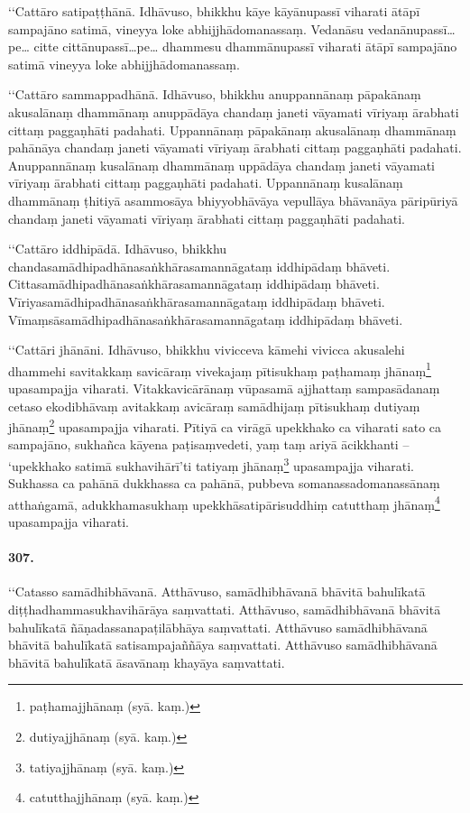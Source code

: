 ‘‘Cattāro satipaṭṭhānā. Idhāvuso, bhikkhu kāye kāyānupassī viharati ātāpī sampajāno satimā, vineyya loke abhijjhādomanassaṃ. Vedanāsu vedanānupassī…pe… citte cittānupassī…pe… dhammesu dhammānupassī viharati ātāpī sampajāno satimā vineyya loke abhijjhādomanassaṃ.

‘‘Cattāro sammappadhānā. Idhāvuso, bhikkhu anuppannānaṃ pāpakānaṃ akusalānaṃ dhammānaṃ anuppādāya chandaṃ janeti vāyamati vīriyaṃ ārabhati cittaṃ paggaṇhāti padahati. Uppannānaṃ pāpakānaṃ akusalānaṃ dhammānaṃ pahānāya chandaṃ janeti vāyamati vīriyaṃ ārabhati cittaṃ paggaṇhāti padahati. Anuppannānaṃ kusalānaṃ dhammānaṃ uppādāya chandaṃ janeti vāyamati vīriyaṃ ārabhati cittaṃ paggaṇhāti padahati. Uppannānaṃ kusalānaṃ dhammānaṃ ṭhitiyā asammosāya bhiyyobhāvāya vepullāya bhāvanāya pāripūriyā chandaṃ janeti vāyamati vīriyaṃ ārabhati cittaṃ paggaṇhāti padahati.

‘‘Cattāro iddhipādā. Idhāvuso, bhikkhu chandasamādhipadhānasaṅkhārasamannāgataṃ iddhipādaṃ bhāveti. Cittasamādhipadhānasaṅkhārasamannāgataṃ iddhipādaṃ bhāveti. Vīriyasamādhipadhānasaṅkhārasamannāgataṃ iddhipādaṃ bhāveti. Vīmaṃsāsamādhipadhānasaṅkhārasamannāgataṃ iddhipādaṃ bhāveti.

‘‘Cattāri jhānāni. Idhāvuso, bhikkhu vivicceva kāmehi vivicca akusalehi dhammehi savitakkaṃ savicāraṃ vivekajaṃ pītisukhaṃ paṭhamaṃ jhānaṃ\footnote{paṭhamajjhānaṃ (syā. kaṃ.)} upasampajja viharati. Vitakkavicārānaṃ vūpasamā ajjhattaṃ sampasādanaṃ cetaso ekodibhāvaṃ avitakkaṃ avicāraṃ samādhijaṃ pītisukhaṃ dutiyaṃ jhānaṃ\footnote{dutiyajjhānaṃ (syā. kaṃ.)} upasampajja viharati. Pītiyā ca virāgā upekkhako ca viharati sato ca sampajāno, sukhañca kāyena paṭisaṃvedeti, yaṃ taṃ ariyā ācikkhanti – ‘upekkhako satimā sukhavihārī’ti tatiyaṃ jhānaṃ\footnote{tatiyajjhānaṃ (syā. kaṃ.)} upasampajja viharati. Sukhassa ca pahānā dukkhassa ca pahānā, pubbeva somanassadomanassānaṃ atthaṅgamā, adukkhamasukhaṃ upekkhāsatipārisuddhiṃ catutthaṃ jhānaṃ\footnote{catutthajjhānaṃ (syā. kaṃ.)} upasampajja viharati.

\paragraph{307.} ‘‘Catasso samādhibhāvanā. Atthāvuso, samādhibhāvanā bhāvitā bahulīkatā diṭṭhadhammasukhavihārāya saṃvattati. Atthāvuso, samādhibhāvanā bhāvitā bahulīkatā ñāṇadassanapaṭilābhāya saṃvattati. Atthāvuso samādhibhāvanā bhāvitā bahulīkatā satisampajaññāya saṃvattati. Atthāvuso samādhibhāvanā bhāvitā bahulīkatā āsavānaṃ khayāya saṃvattati.

